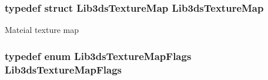 \hypertarget{group__material_gaf0e1d247b09e9323833e378665035611}{
\subsubsection[{Lib3ds\-Texture\-Map}]{\setlength{\rightskip}{0pt plus 5cm}typedef {\bf struct} {\bf Lib3ds\-Texture\-Map}  {\bf Lib3ds\-Texture\-Map}}}\label{group__material_gaf0e1d247b09e9323833e378665035611}
Mateial texture map \hypertarget{group__material_gad60b47978e75464a27e6663c5f1af58b}{
\subsubsection[{Lib3ds\-Texture\-Map\-Flags}]{\setlength{\rightskip}{0pt plus 5cm}typedef enum {\bf Lib3ds\-Texture\-Map\-Flags}  {\bf Lib3ds\-Texture\-Map\-Flags}}}\label{group__material_gad60b47978e75464a27e6663c5f1af58b}


